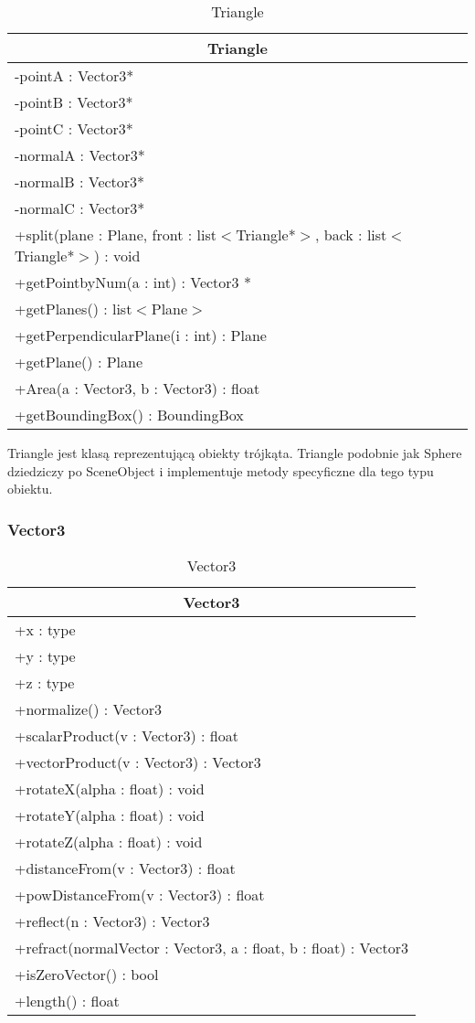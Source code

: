 \footnotesize
\begin{longtable}{|p{14cm}|}
    \caption{Triangle} \label{tab:Triangle} \\ \hline
    \multicolumn{1}{|c|}{Triangle} \\ \hline
    -pointA : Vector3* \\
    -pointB : Vector3* \\
    -pointC : Vector3* \\
    -normalA : Vector3* \\
    -normalB : Vector3* \\
    -normalC : Vector3* \\
    \hline
	+split(plane : Plane, front : list$<$Triangle*$>$, back : list$<$Triangle*$>$) : void \\ 
	+getPointbyNum(a : int) : Vector3 * \\
	+getPlanes() : list$<$Plane$>$ \\
	+getPerpendicularPlane(i : int) : Plane \\
	+getPlane() : Plane \\
	+Area(a : Vector3, b : Vector3) : float \\
	+getBoundingBox() : BoundingBox \\
	\hline
\end{longtable}
\normalsize

Triangle jest klasą reprezentującą obiekty trójkąta. Triangle podobnie jak Sphere dziedziczy po SceneObject i implementuje metody specyficzne dla tego typu obiektu.

\subsubsection{Vector3}

\footnotesize
\begin{longtable}{|p{14cm}|}
    \caption{Vector3} \label{tab:Vector3} \\ \hline
    \multicolumn{1}{|c|}{Vector3} \\ \hline
    +x : type \\
    +y : type \\
    +z : type \\
     \hline
	+normalize() : Vector3 \\ 
	+scalarProduct(v : Vector3) : float \\
	+vectorProduct(v : Vector3) : Vector3 \\
	+rotateX(alpha : float) : void \\
	+rotateY(alpha : float) : void \\
	+rotateZ(alpha : float) : void \\
	+distanceFrom(v : Vector3) : float \\
	+powDistanceFrom(v : Vector3) : float \\
	+reflect(n : Vector3) : Vector3 \\
	+refract(normalVector : Vector3, a : float, b : float) : Vector3 \\
	+isZeroVector() : bool \\
	+length() : float \\
	\hline
\end{longtable}
\normalsize

